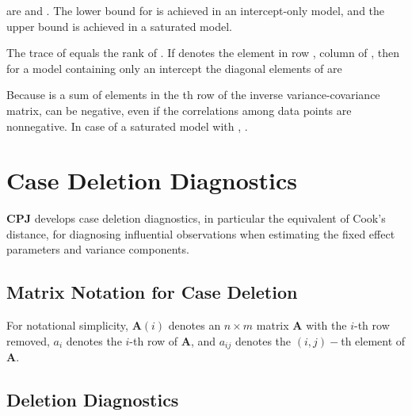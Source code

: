 \documentclass[12pt, a4paper]{article}
\begin{document}
are  and . The lower bound for  is achieved in an intercept-only model, and the upper bound is achieved in a saturated model. 

The trace of  equals the rank of .
If  denotes the element in row , column  of , then for a model containing only an intercept the diagonal elements of  are

Because  is a sum of elements in the th row of the inverse variance-covariance matrix,  can be negative, even if the correlations among data points are nonnegative. In case of a saturated model with , .			
			
			\section{Case Deletion Diagnostics} %
			
			\textbf{CPJ} develops  case deletion diagnostics, in particular the equivalent of  Cook's distance, for diagnosing influential observations when estimating the fixed effect parameters and variance components.
			
			\subsection{Matrix Notation for Case Deletion} %
			
			
			For notational simplicity, $\boldsymbol{A}(i)$ denotes an $n \times m$ matrix $\boldsymbol{A}$ with the $i$-th row
			removed, $a_i$ denotes the $i$-th row of $\boldsymbol{A}$, and $a_{ij}$ denotes the $(i, j)-$th element of $\boldsymbol{A}$.
			
			
			
			\subsection{Deletion Diagnostics}
			
\end{document}
